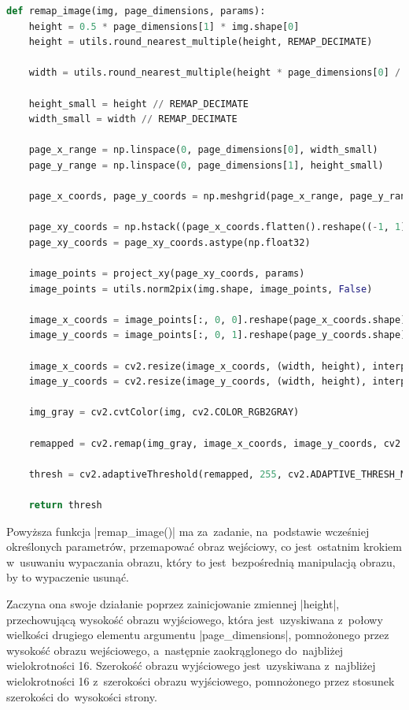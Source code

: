 \begin{lstlisting}[caption={\pyth|remap_image()| - funkcja remapowania wypaczonego obrazu.}, label={remap-image}, language=Python]
def remap_image(img, page_dimensions, params):
	height = 0.5 * page_dimensions[1] * img.shape[0]
	height = utils.round_nearest_multiple(height, REMAP_DECIMATE)
	
	width = utils.round_nearest_multiple(height * page_dimensions[0] / page_dimensions[1], REMAP_DECIMATE)
	
	height_small = height // REMAP_DECIMATE
	width_small = width // REMAP_DECIMATE
	
	page_x_range = np.linspace(0, page_dimensions[0], width_small)
	page_y_range = np.linspace(0, page_dimensions[1], height_small)
	
	page_x_coords, page_y_coords = np.meshgrid(page_x_range, page_y_range)
	
	page_xy_coords = np.hstack((page_x_coords.flatten().reshape((-1, 1)), page_y_coords.flatten().reshape((-1, 1))))
	page_xy_coords = page_xy_coords.astype(np.float32)
	
	image_points = project_xy(page_xy_coords, params)
	image_points = utils.norm2pix(img.shape, image_points, False)
	
	image_x_coords = image_points[:, 0, 0].reshape(page_x_coords.shape)
	image_y_coords = image_points[:, 0, 1].reshape(page_y_coords.shape)
	
	image_x_coords = cv2.resize(image_x_coords, (width, height), interpolation=cv2.INTER_CUBIC)
	image_y_coords = cv2.resize(image_y_coords, (width, height), interpolation=cv2.INTER_CUBIC)
	
	img_gray = cv2.cvtColor(img, cv2.COLOR_RGB2GRAY)
	
	remapped = cv2.remap(img_gray, image_x_coords, image_y_coords, cv2.INTER_CUBIC, None, cv2.BORDER_REPLICATE)
	
	thresh = cv2.adaptiveThreshold(remapped, 255, cv2.ADAPTIVE_THRESH_MEAN_C, cv2.THRESH_BINARY, ADA_THRESH_WIN_SZ, 25)
	
	return thresh
\end{lstlisting}

Powyższa funkcja \pyth|remap_image()| ma za~zadanie, na~podstawie wcześniej określonych parametrów, przemapować obraz wejściowy, co jest~ostatnim krokiem w~usuwaniu wypaczania obrazu, który to jest~bezpośrednią manipulacją obrazu, by to wypaczenie usunąć.

Zaczyna ona swoje działanie poprzez zainicjowanie zmiennej \pyth|height|, przechowującą wysokość obrazu wyjściowego, która jest~uzyskiwana z~połowy wielkości drugiego elementu argumentu \linebreak \pyth|page_dimensions|, pomnożonego przez wysokość obrazu wejściowego, a~następnie zaokrąglonego do~najbliżej wielokrotności 16. Szerokość obrazu wyjściowego jest~uzyskiwana z~najbliżej wielokrotności 16 z~szerokości obrazu wyjściowego, pomnożonego przez stosunek szerokości do~wysokości strony.

